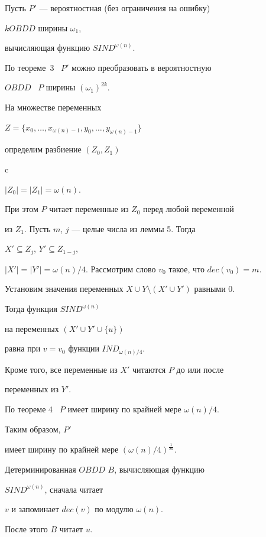\begin{pf}


Пусть $P'$ --- вероятностная (без ограничения на ошибку)


$kOBDD$ ширины $\omega_1$,


вычисляющая функцию $SIND^{\omega(n)}$.


По теореме~3 \ $P'$ можно преобразовать в вероятностную


$OBDD$ \ $P$ ширины $(\omega_1)^{2k}$.





На множестве переменных


$Z=\{x_0,\dotsc,x_{\omega(n)-1},y_0,\dotsc,y_{\omega(n)-1}\}$


определим разбиение $(Z_0,Z_1)$


c


$|Z_0|=|Z_1|=\omega(n)$.


При этом $P$ читает переменные из $Z_0$ перед любой переменной


из $Z_1$. Пусть $m$, $j$ --- целые числа из леммы 5. Тогда


$X'\subseteq Z_j$, $Y'\subseteq Z_{1-j}$,


$|X'|=|Y'|=\omega(n)/4$. Рассмотрим слово $v_0$ такое, что $dec(v_0)=m$.


Установим значения переменных $X\cup Y\setminus(X'\cup Y')$ равными 0.


Тогда функция $SIND^{\omega(n)}$


на переменных $(X'\cup Y'\cup \{u\})$


равна при $v=v_0$ функции $IND_{\omega(n)/4}$.


Кроме того, все переменные из $X'$ читаются $P$ до или после


переменных из $Y'$.


По теореме 4 \ $P$ имеет ширину по крайней мере $\omega(n)/4$.


Таким образом, $P'$


имеет ширину по крайней мере $(\omega(n)/4)^{\frac{1}{2k}}$.





Детерминированная $OBDD$ $B$, вычисляющая функцию


$SIND^{\omega(n)}$, сначала читает


$v$ и запоминает $dec(v)$ по модулю $\omega(n)$.


После этого $B$ читает $u$.






\end{pf}
